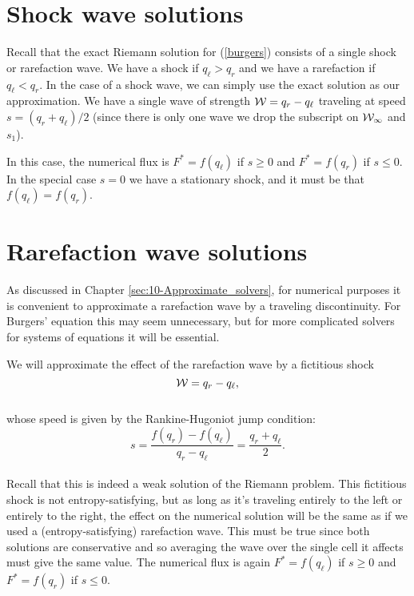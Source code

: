 \documentclass{SIAMbook2016}
\begin{document}
\hypertarget{shock-wave-solutions}{%
\section{Shock wave solutions}\label{shock-wave-solutions}}

Recall that the exact Riemann solution for (\ref{burgers}) consists of a
single shock or rarefaction wave. We have a shock if \(q_\ell>q_r\) and
we have a rarefaction if \(q_\ell < q_r\). In the case of a shock wave,
we can simply use the exact solution as our approximation. We have a
single wave of strength \({\cal W} = q_r-q_\ell\) traveling at speed
\(s=(q_r+q_\ell)/2\) (since there is only one wave we drop the subscript
on \({\cal W_1}\) and \(s_1\)).

In this case, the numerical flux is \(F^*=f(q_\ell)\) if \(s\geq 0\) and
\(F^*=f(q_r)\) if \(s\leq 0\). In the special case \(s=0\) we have a
stationary shock, and it must be that \(f(q_\ell)=f(q_r)\).

\hypertarget{rarefaction-wave-solutions}{%
\section{Rarefaction wave solutions}\label{rarefaction-wave-solutions}}

As discussed in Chapter \ref{sec:10-Approximate_solvers}, for numerical
purposes it is convenient to approximate a rarefaction wave by a
traveling discontinuity. For Burgers' equation this may seem
unnecessary, but for more complicated solvers for systems of equations
it will be essential.

We will approximate the effect of the rarefaction wave by a fictitious
shock \[{\cal W} = q_r-q_\ell,\]\\
whose speed is given by the Rankine-Hugoniot jump condition:\\
\[s = \frac{f(q_r)-f(q_\ell)}{q_r-q_\ell} = \frac{q_r + q_\ell}{2}.\]\\
Recall that this is indeed a weak solution of the Riemann problem. This
fictitious shock is not entropy-satisfying, but as long as it's
traveling entirely to the left or entirely to the right, the effect on
the numerical solution will be the same as if we used a
(entropy-satisfying) rarefaction wave. This must be true since both
solutions are conservative and so averaging the wave over the single
cell it affects must give the same value. The numerical flux is again
\(F^*=f(q_\ell)\) if \(s\geq 0\) and \(F^*=f(q_r)\) if \(s \leq 0\).
\end{document}
